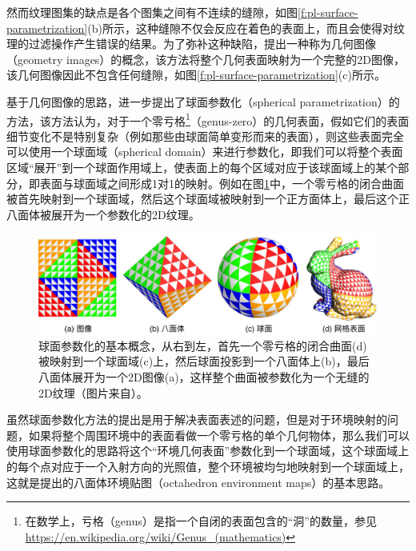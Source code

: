 然而纹理图集的缺点是各个图集之间有不连续的缝隙，如图\ref{f:pl-surface-parametrization}(b)所示，这种缝隙不仅会反应在着色的表面上，而且会使得对纹理的过滤操作产生错误的结果。为了弥补这种缺陷，\cite{a:Geometryimages}提出一种称为几何图像（geometry images）的概念，该方法将整个几何表面映射为一个完整的2D图像，该几何图像因此不包含任何缝隙，如图\ref{f:pl-surface-parametrization}(c)所示。

基于几何图像的思路，\cite{a:SphericalParametrizationandRemeshing}进一步提出了球面参数化（spherical parametrization）的方法，该方法认为，对于一个零亏格\footnote{在数学上，亏格（genus）是指一个自闭的表面包含的“洞”的数量，参见\url{https://en.wikipedia.org/wiki/Genus_(mathematics)}}（genus-zero）的几何表面，假如它们的表面细节变化不是特别复杂（例如那些由球面简单变形而来的表面），则这些表面完全可以使用一个球面域（spherical domain）来进行参数化，即我们可以将整个表面区域“展开”到一个球面作用域上，使表面上的每个区域对应于该球面域上的某个部分，即表面与球面域之间形成1对1的映射。例如在图\ref{f:pl-spherical-parametrization}中，一个零亏格的闭合曲面被首先映射到一个球面域，然后这个球面域被映射到一个正方面体上，最后这个正八面体被展开为一个参数化的2D纹理。
	
\begin{figure}
	\includegraphics[width=\textwidth]{figures/pl/spherical-parametrization}
	\caption{球面参数化的基本概念，从右到左，首先一个零亏格的闭合曲面(d)被映射到一个球面域(c)上，然后球面投影到一个八面体上(b)，最后八面体展开为一个2D图像(a)，这样整个曲面被参数化为一个无缝的2D纹理（图片来自\cite{a:SphericalParametrizationandRemeshing}）。}
	\label{f:pl-spherical-parametrization}
\end{figure}

虽然球面参数化方法的提出是用于解决表面表述的问题，但是对于环境映射的问题，如果将整个周围环境中的表面看做一个零亏格的单个几何物体，那么我们可以使用球面参数化的思路将这个“环境几何表面”参数化到一个球面域，这个球面域上的每个点对应于一个入射方向的光照值，整个环境被均匀地映射到一个球面域上，这就是\cite{a:OctahedronEnvironmentMaps}提出的八面体环境贴图（octahedron environment maps）的基本思路。

